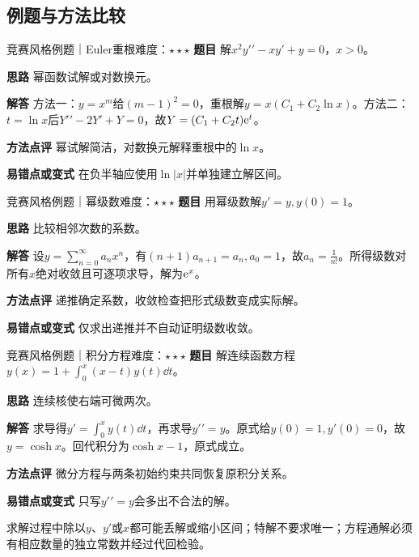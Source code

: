 \subsection{例题与方法比较}
\begin{example}{竞赛风格例题｜Euler重根}{难度：$\star\star\star$}
\label{ex:4:13}\textbf{题目} 解$x^2y\prime\prime-xy\prime+y=0$，$x>0$。\par
\textbf{思路} 幂函数试解或对数换元。\par
\textbf{解答} 方法一：$y=x^m$给$(m-1)^2=0$，重根解$y=x(C_1+C_2\ln x)$。方法二：$t=\ln x$后$Y\prime\prime-2Y\prime+Y=0$，故$Y=(C_1+C_2t)\mathrm{e}^t$。\par
\textbf{方法点评} 幂试解简洁，对数换元解释重根中的$\ln x$。\par
\textbf{易错点或变式} 在负半轴应使用$\ln|x|$并单独建立解区间。
\end{example}
\begin{example}{竞赛风格例题｜幂级数}{难度：$\star\star\star$}
\label{ex:4:14}\textbf{题目} 用幂级数解$y\prime=y,y(0)=1$。\par
\textbf{思路} 比较相邻次数的系数。\par
\textbf{解答} 设$y=\sum_{n=0}^{\infty}a_nx^n$，有$(n+1)a_{n+1}=a_n,a_0=1$，故$a_n=\frac{1}{n!}$。所得级数对所有$x$绝对收敛且可逐项求导，解为$\mathrm{e}^x$。\par
\textbf{方法点评} 递推确定系数，收敛检查把形式级数变成实际解。\par
\textbf{易错点或变式} 仅求出递推并不自动证明级数收敛。
\end{example}
\begin{example}{竞赛风格例题｜积分方程}{难度：$\star\star\star$}
\label{ex:4:15}\textbf{题目} 解连续函数方程$y(x)=1+\int_0^x(x-t)y(t)\dd t$。\par
\textbf{思路} 连续核使右端可微两次。\par
\textbf{解答} 求导得$y\prime=\int_0^xy(t)\dd t$，再求导$y\prime\prime=y$。原式给$y(0)=1,y\prime(0)=0$，故$y=\cosh x$。回代积分为$\cosh x-1$，原式成立。\par
\textbf{方法点评} 微分方程与两条初始约束共同恢复原积分关系。\par
\textbf{易错点或变式} 只写$y\prime\prime=y$会多出不合法的解。
\end{example}
\begin{warning}求解过程中除以$y$、$y\prime$或$x$都可能丢解或缩小区间；特解不要求唯一；方程通解必须有相应数量的独立常数并经过代回检验。\end{warning}








